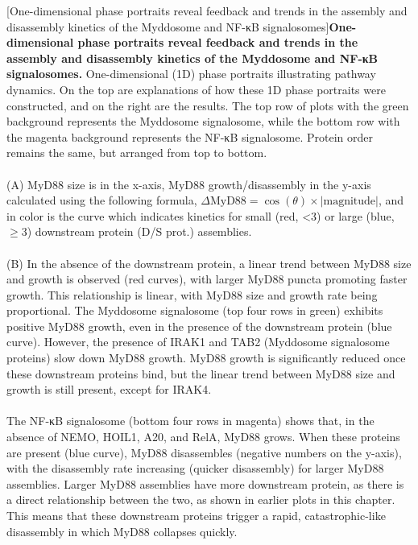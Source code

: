 \begin{centering}
\captionsetup{parbox=none}
[One-dimensional phase portraits reveal feedback and trends in the assembly and disassembly kinetics of the Myddosome and NF-κB signalosomes]{\textbf{One-dimensional phase portraits reveal feedback and trends in the assembly and disassembly kinetics of the Myddosome and NF-κB signalosomes.} One-dimensional (1D) phase portraits illustrating pathway dynamics. On the top are explanations of how these 1D phase portraits were constructed, and on the right are the results. The top row of plots with the green background represents the Myddosome signalosome, while the bottom row with the magenta background represents the NF-κB signalosome. Protein order remains the same, but arranged from top to bottom.
\\
\\
(A) MyD88 size is in the x-axis, MyD88 growth/disassembly in the y-axis calculated using the following formula, $\Delta\text{MyD88} = \cos(\theta) \times |\text{magnitude}|$, and in color is the curve which indicates kinetics for small (red, <3\times) or large (blue, $\geq$3\times) downstream protein (D/S prot.) assemblies.
\\
\\
(B) In the absence of the downstream protein, a linear trend between MyD88 size and growth is observed (red curves), with larger MyD88 puncta promoting faster growth. This relationship is linear, with MyD88 size and growth rate being proportional. The Myddosome signalosome (top four rows in green) exhibits positive MyD88 growth, even in the presence of the downstream protein (blue curve). However, the presence of IRAK1 and TAB2 (Myddosome signalosome proteins) slow down MyD88 growth. MyD88 growth is significantly reduced once these downstream proteins bind, but the linear trend between MyD88 size and growth is still present, except for IRAK4.
\\
\\
The NF-κB signalosome (bottom four rows in magenta) shows that, in the absence of NEMO, HOIL1, A20, and RelA, MyD88 grows. When these proteins are present (blue curve), MyD88 disassembles (negative numbers on the y-axis), with the disassembly rate increasing (quicker disassembly) for larger MyD88 assemblies. Larger MyD88 assemblies have more downstream protein, as there is a direct relationship between the two, as shown in earlier plots in this chapter. This means that these downstream proteins trigger a rapid, catastrophic-like disassembly in which MyD88 collapses quickly.
\\
}
\end{centering}
